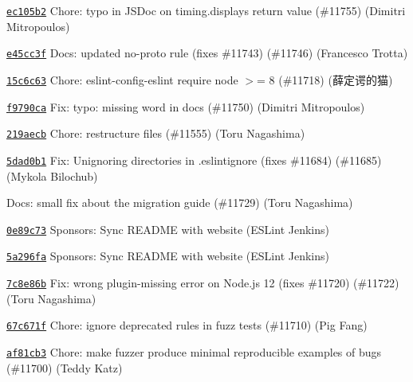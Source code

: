 \begin{DoxyItemize}
\item \href{https://github.com/eslint/eslint/commit/ec105b24f7e036ecdc4267f018529ac3765e29d5}{\texttt{ {\ttfamily ec105b2}}} Chore\+: typo in J\+S\+Doc on timing.\+display\textquotesingle{}s return value (\#11755) (Dimitri Mitropoulos)
\item \href{https://github.com/eslint/eslint/commit/e45cc3f3dc44f3a5b6b713a1bf5ce6e46d87ca49}{\texttt{ {\ttfamily e45cc3f}}} Docs\+: updated no-\/proto rule (fixes \#11743) (\#11746) (Francesco Trotta)
\item \href{https://github.com/eslint/eslint/commit/15c6c6374c0425d5402142d012a541fa208bc9da}{\texttt{ {\ttfamily 15c6c63}}} Chore\+: eslint-\/config-\/eslint require node $>$= 8 (\#11718) (薛定谔的猫)
\item \href{https://github.com/eslint/eslint/commit/f9790ca1baec1275f3c946586766a5713258ac32}{\texttt{ {\ttfamily f9790ca}}} Fix\+: typo\+: missing word in docs (\#11750) (Dimitri Mitropoulos)
\item \href{https://github.com/eslint/eslint/commit/219aecb78bc646d44bad27dc775a9b3d3dc58232}{\texttt{ {\ttfamily 219aecb}}} Chore\+: restructure files (\#11555) (Toru Nagashima)
\item \href{https://github.com/eslint/eslint/commit/5dad0b1d80c9cf380c49f46266c35d461d3cecad}{\texttt{ {\ttfamily 5dad0b1}}} Fix\+: Unignoring directories in .eslintignore (fixes \#11684) (\#11685) (Mykola Bilochub)
\item \href{https://github.com/eslint/eslint/commit/462509058e46770cf70307cf8dba279f0e73b967}{\texttt{ {}}} Docs\+: small fix about the migration guide (\#11729) (Toru Nagashima)
\item \href{https://github.com/eslint/eslint/commit/0e89c73177398eaf978a50d5b0f79ff8e43512f2}{\texttt{ {\ttfamily 0e89c73}}} Sponsors\+: Sync R\+E\+A\+D\+ME with website (E\+S\+Lint Jenkins)
\item \href{https://github.com/eslint/eslint/commit/5a296fa0c9345ad1a55e2b257e5f6c9f05fff362}{\texttt{ {\ttfamily 5a296fa}}} Sponsors\+: Sync R\+E\+A\+D\+ME with website (E\+S\+Lint Jenkins)
\item \href{https://github.com/eslint/eslint/commit/7c8e86bf2c900cec7cd1dfd529a8c77cc81ef34c}{\texttt{ {\ttfamily 7c8e86b}}} Fix\+: wrong \textquotesingle{}plugin-\/missing\textquotesingle{} error on Node.\+js 12 (fixes \#11720) (\#11722) (Toru Nagashima)
\item \href{https://github.com/eslint/eslint/commit/67c671fdc1c8b08cb8d263a9bb2151e3108c88b4}{\texttt{ {\ttfamily 67c671f}}} Chore\+: ignore deprecated rules in fuzz tests (\#11710) (Pig Fang)
\item \href{https://github.com/eslint/eslint/commit/af81cb3ecc5e6bf43a6a2d8f326103350513a1b8}{\texttt{ {\ttfamily af81cb3}}} Chore\+: make fuzzer produce minimal reproducible examples of bugs (\#11700) (Teddy Katz)
\end{DoxyItemize}


